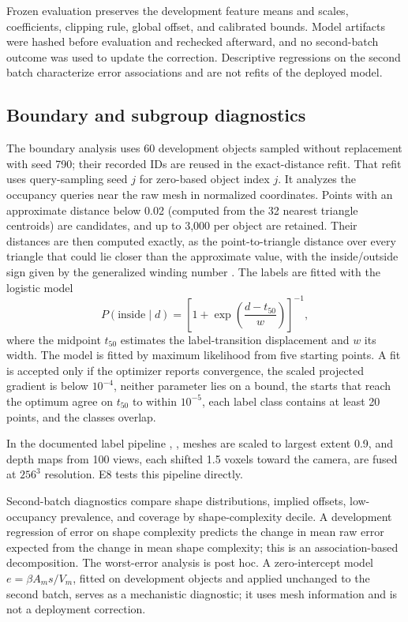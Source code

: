 \documentclass[journal]{IEEEtran}
\begin{document}
Frozen evaluation preserves the development feature means and scales, coefficients, clipping rule, global offset, and calibrated bounds. Model artifacts were hashed before evaluation and rechecked afterward, and no second-batch outcome was used to update the correction. Descriptive regressions on the second batch characterize error associations and are not refits of the deployed model.

\subsection{Boundary and subgroup diagnostics}

The boundary analysis uses 60 development objects sampled without replacement with seed 790; their recorded IDs are reused in the exact-distance refit. That refit uses query-sampling seed $j$ for zero-based object index $j$. It analyzes the occupancy queries near the raw mesh in normalized coordinates. Points with an approximate distance below 0.02 (computed from the 32 nearest triangle centroids) are candidates, and up to 3,000 per object are retained. Their distances are then computed exactly, as the point-to-triangle distance over every triangle that could lie closer than the approximate value, with the inside/outside sign given by the generalized winding number \cite{ref24}. The labels are fitted with the logistic model
\begin{equation}
P(\mathrm{inside}\mid d)=\left[1+\exp\!\left(\frac{d-t_{50}}{w}\right)\right]^{-1},
\end{equation}
where the midpoint $t_{50}$ estimates the label-transition displacement and $w$ its width. The model is fitted by maximum likelihood from five starting points. A fit is accepted only if the optimizer reports convergence, the scaled projected gradient is below $10^{-4}$, neither parameter lies on a bound, the starts that reach the optimum agree on $t_{50}$ to within $10^{-5}$, each label class contains at least 20 points, and the classes overlap.

In the documented label pipeline \cite{ref20}, \cite{ref34}, meshes are scaled to largest extent 0.9, and depth maps from 100 views, each shifted 1.5 voxels toward the camera, are fused at $256^3$ resolution. E8 tests this pipeline directly.

Second-batch diagnostics compare shape distributions, implied offsets, low-occupancy prevalence, and coverage by shape-complexity decile. A development regression of error on shape complexity predicts the change in mean raw error expected from the change in mean shape complexity; this is an association-based decomposition. The worst-error analysis is post hoc. A zero-intercept model $e=\beta A_ms/V_m$, fitted on development objects and applied unchanged to the second batch, serves as a mechanistic diagnostic; it uses mesh information and is not a deployment correction.
\end{document}
